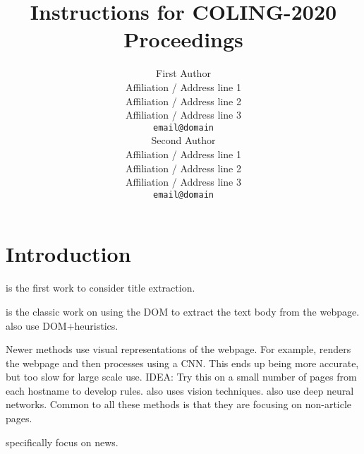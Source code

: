 \documentclass[11pt]{article}
\title{Instructions for COLING-2020 Proceedings}
\author{First Author \\
  Affiliation / Address line 1 \\
  Affiliation / Address line 2 \\
  Affiliation / Address line 3 \\
  {\tt email@domain} \\\And
  Second Author \\
  Affiliation / Address line 1 \\
  Affiliation / Address line 2 \\
  Affiliation / Address line 3 \\
  {\tt email@domain} \\}
\date{}
\begin{document}
\maketitle
\begin{abstract}
\end{abstract}

%
% 

\section{Introduction}
\label{sec:intro}

\cite{hu2005title} is the first work to consider title extraction.

\cite{gupta2003dom} is the classic work on using the DOM to extract the text body from the webpage.
\cite{weninger2010cetr,sun2011dom} also use DOM+heuristics.

Newer methods use visual representations of the webpage.
For example, \cite{DBLP:conf/paclic/Nguyen-HoangPJL18} renders the webpage and then processes using a CNN.
This ends up being more accurate, but too slow for large scale use.
IDEA: Try this on a small number of pages from each hostname to develop rules.
\cite{zeleny2017box,liu2017deep,song2015hybrid} also uses vision techniques.
\cite{gogar2016deep} also use deep neural networks.
Common to all these methods is that they are focusing on non-article pages.

\cite{wu2013web,carey2016html,wu2016language,wu2012extracting,DBLP:conf/widm/MohammadzadehGSH12,DBLP:journals/mms/UtomoL20,kim2013main,DBLP:conf/ic3k/MohammadzadehGSN11,endredy2013more} specifically focus on news.
\end{document}
